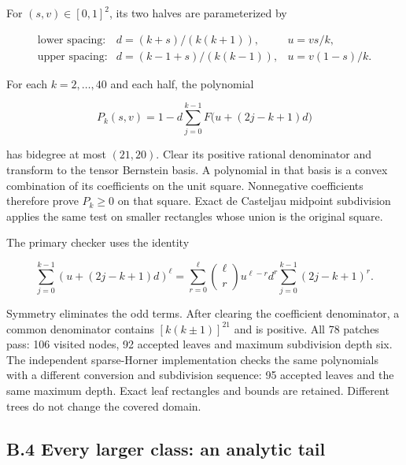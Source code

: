 \documentclass[11pt,a4paper]{article}
\begin{document}
\begin{samepage}

For \((s,v)\in[0,1]^2\), its two halves are parameterized by

\[
\begin{array}{lll}
\text{lower spacing:}&d=(k+s)/(k(k+1)),&u=vs/k,\\
\text{upper spacing:}&d=(k-1+s)/(k(k-1)),&u=v(1-s)/k.
\end{array}
\]

\end{samepage}

\begin{samepage}

For each \(k=2,\ldots,40\) and each half, the polynomial

\[P_k(s,v)=1-d\sum_{j=0}^{k-1}F\big(u+(2j-k+1)d\big)\]

\end{samepage}

has bidegree at most \((21,20)\). Clear its positive rational
denominator and transform to the tensor Bernstein basis. A polynomial in
that basis is a convex combination of its coefficients on the unit
square. Nonnegative coefficients therefore prove \(P_k\ge0\) on that
square. Exact de Casteljau midpoint subdivision applies the same test on
smaller rectangles whose union is the original square.

\begin{samepage}

The primary checker uses the identity

\[
\sum_{j=0}^{k-1}(u+(2j-k+1)d)^\ell
=\sum_{r=0}^{\ell}{\ell\choose r}u^{\ell-r}d^r
\sum_{j=0}^{k-1}(2j-k+1)^r.
\]

\end{samepage}

Symmetry eliminates the odd terms. After clearing the coefficient
denominator, a common denominator contains \([k(k\pm1)]^{21}\) and is
positive. All 78 patches pass: 106 visited nodes, 92 accepted leaves and
maximum subdivision depth six. The independent sparse-Horner
implementation checks the same polynomials with a different conversion
and subdivision sequence: 95 accepted leaves and the same maximum depth.
Exact leaf rectangles and bounds are retained. Different trees do not
change the covered domain.


\hypertarget{b.4-every-larger-class-an-analytic-tail}{%
\subsection{B.4 Every larger class: an analytic
tail}\label{b.4-every-larger-class-an-analytic-tail}}
\end{document}
